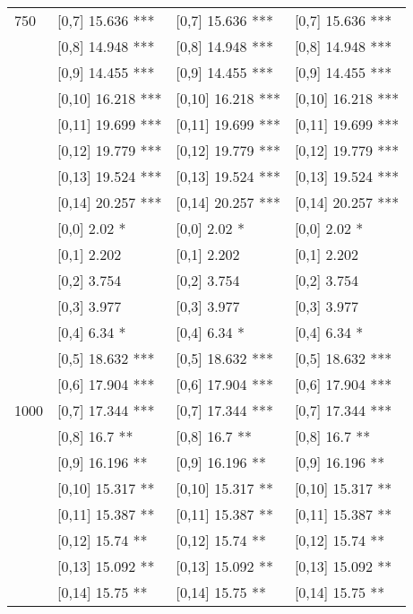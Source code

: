 \begin{table}
\begin{tabular}[t]{llll}
750 & {}[0,7] 15.636 *** & {}[0,7] 15.636 *** & {}[0,7] 15.636 ***\\
 & {}[0,8] 14.948 *** & {}[0,8] 14.948 *** & {}[0,8] 14.948 ***\\
 & {}[0,9] 14.455 *** & {}[0,9] 14.455 *** & {}[0,9] 14.455 ***\\
\addlinespace
 & {}[0,10] 16.218 *** & {}[0,10] 16.218 *** & {}[0,10] 16.218 ***\\
 & {}[0,11] 19.699 *** & {}[0,11] 19.699 *** & {}[0,11] 19.699 ***\\
 & {}[0,12] 19.779 *** & {}[0,12] 19.779 *** & {}[0,12] 19.779 ***\\
 & {}[0,13] 19.524 *** & {}[0,13] 19.524 *** & {}[0,13] 19.524 ***\\
 & {}[0,14] 20.257 *** & {}[0,14] 20.257 *** & {}[0,14] 20.257 ***\\
\addlinespace
 & {}[0,0] 2.02 * & {}[0,0] 2.02 * & {}[0,0] 2.02 *\\
 & {}[0,1] 2.202 & {}[0,1] 2.202 & {}[0,1] 2.202\\
 & {}[0,2] 3.754 & {}[0,2] 3.754 & {}[0,2] 3.754\\
 & {}[0,3] 3.977 & {}[0,3] 3.977 & {}[0,3] 3.977\\
 & {}[0,4] 6.34 * & {}[0,4] 6.34 * & {}[0,4] 6.34 *\\
\addlinespace
 & {}[0,5] 18.632 *** & {}[0,5] 18.632 *** & {}[0,5] 18.632 ***\\
 & {}[0,6] 17.904 *** & {}[0,6] 17.904 *** & {}[0,6] 17.904 ***\\
1000 & {}[0,7] 17.344 *** & {}[0,7] 17.344 *** & {}[0,7] 17.344 ***\\
 & {}[0,8] 16.7 ** & {}[0,8] 16.7 ** & {}[0,8] 16.7 **\\
 & {}[0,9] 16.196 ** & {}[0,9] 16.196 ** & {}[0,9] 16.196 **\\
\addlinespace
 & {}[0,10] 15.317 ** & {}[0,10] 15.317 ** & {}[0,10] 15.317 **\\
 & {}[0,11] 15.387 ** & {}[0,11] 15.387 ** & {}[0,11] 15.387 **\\
 & {}[0,12] 15.74 ** & {}[0,12] 15.74 ** & {}[0,12] 15.74 **\\
 & {}[0,13] 15.092 ** & {}[0,13] 15.092 ** & {}[0,13] 15.092 **\\
 & {}[0,14] 15.75 ** & {}[0,14] 15.75 ** & {}[0,14] 15.75 **\\
\bottomrule
\end{tabular}
\end{table}
